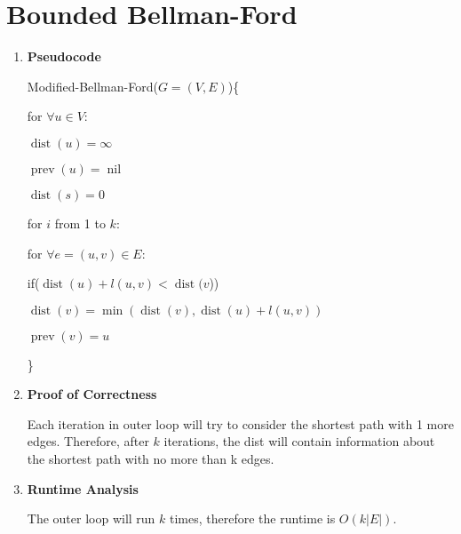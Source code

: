 \documentclass[11pt]{article}
\newenvironment{qparts}{\begin{enumerate}[{(}a{)}]}{\end{enumerate}}
\begin{document}
\section{Bounded Bellman-Ford}

\begin{qparts}
	\item \textbf{Pseudocode}

	Modified-Bellman-Ford($G = (V, E)$)\{

		\qquad for $\forall u \in V$:
		
		\qquad\qquad $\operatorname{dist}(u) = \infty$
		
		\qquad\qquad $\operatorname{prev}(u) = \operatorname{nil}$
		
		\qquad $\operatorname{dist}(s) = 0$
	
		\qquad for $i$ from 1 to $k$:
		
		
		\qquad\qquad for $\forall e=(u,v) \in E$:
		
		\qquad\qquad\qquad if($\operatorname{dist}(u) + l(u, v) < \operatorname{dist}(v$))
		
		\qquad\qquad\qquad\qquad  $\operatorname{dist}(v) = \operatorname{min}(\operatorname{dist}(v), \operatorname{dist}(u) + l(u, v))$
		
		\qquad\qquad\qquad\qquad $\operatorname{prev}(v) = u$
	
	\}
		
	\item \textbf{Proof of Correctness}
	
	Each iteration in outer loop will try to consider the shortest path with 1 more edges. Therefore, after $k$ iterations, the dist will contain information about the shortest path with no more than k edges.

	\item \textbf{Runtime Analysis}
	
	The outer loop will run $k$ times, therefore the runtime is $O(k|E|)$.
	

\end{qparts}
     
\end{document}
